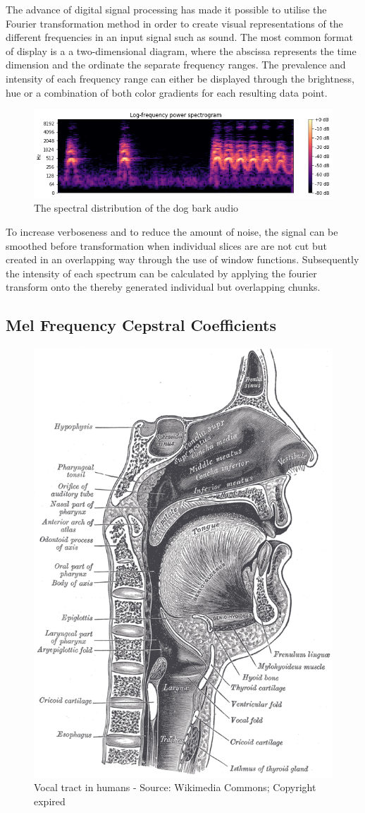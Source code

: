 The advance of digital signal processing has made it possible to utilise the Fourier transformation method in order to create visual representations of the different frequencies in an input signal such as sound. The most common format of display is a a two-dimensional diagram, where the abscissa represents the time dimension and the ordinate the separate frequency ranges. The prevalence and intensity of each frequency range can either be displayed through the brightness, hue or a combination of both color gradients for each resulting data point. 


\begin{figure}[h]
    \centering
	\includegraphics[width=\textwidth]{./images/illustrations/spectrogram}
    \caption{The spectral distribution of the dog bark audio}
    \label{fig:spef}
\end{figure}



To increase verboseness and to reduce the amount of noise, the signal can be smoothed before transformation when individual slices are are not cut but created in an overlapping way through the use of window functions. Subsequently the intensity of each spectrum can be calculated by applying the fourier transform onto the thereby generated individual but overlapping chunks.


\subsection{Mel Frequency Cepstral Coefficients}


\begin{figure}
    \centering
	\includegraphics[width=.375\textwidth]{./images/illustrations/Sagittalmouth}
    \caption{Vocal tract in humans - Source: Wikimedia Commons; Copyright expired}
    \label{fig: Sagittalmouth}
\end{figure}



